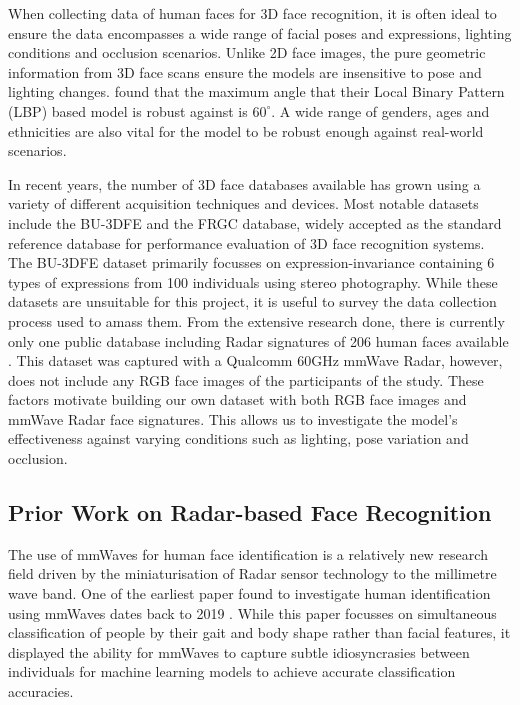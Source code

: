 \documentclass{interim}
\begin{document}
When collecting data of human faces for 3D face recognition, it is often ideal to ensure the data encompasses a wide range of facial poses and expressions, lighting conditions and occlusion scenarios. Unlike 2D face images, the pure geometric information from 3D face scans ensure the models are insensitive to pose and lighting changes. \cite{prabhu2011unconstrained} found that the maximum angle that their Local Binary Pattern (LBP) based model is robust against is $60^\circ$. A wide range of genders, ages and ethnicities are also vital for the model to be robust enough against real-world scenarios.

In recent years, the number of 3D face databases available has grown using a variety of different acquisition techniques and devices. Most notable datasets include the BU-3DFE \cite{yin20063d} and the FRGC \cite{phillips2005overview} database, widely accepted as the standard reference database for performance evaluation of 3D face recognition systems. The BU-3DFE dataset primarily focusses on expression-invariance containing 6 types of expressions from 100 individuals using stereo photography. While these datasets are unsuitable for this project, it is useful to survey the data collection process used to amass them. From the extensive research done, there is currently only one public database including Radar signatures of 206 human faces available \cite{mmwavefacedata}. This dataset was captured with a Qualcomm 60GHz mmWave Radar, however, does not include any RGB face images of the participants of the study. These factors motivate building our own dataset with both RGB face images and mmWave Radar face signatures. This allows us to investigate the model's effectiveness against varying conditions such as lighting, pose variation and occlusion.

\subsection{Prior Work on Radar-based Face Recognition}
The use of mmWaves for human face identification is a relatively new research field driven by the miniaturisation of Radar sensor technology to the millimetre wave band. One of the earliest paper found to investigate human identification using mmWaves dates back to 2019 \cite{zhao2019mid}. While this paper focusses on simultaneous classification of people by their gait and body shape rather than facial features, it displayed the ability for mmWaves to capture subtle idiosyncrasies between individuals for machine learning models to achieve accurate classification accuracies.  
\end{document}
